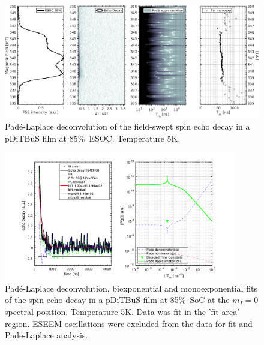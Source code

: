 \begin{figure}[h]
\center
	\includegraphics[width=1\textwidth]{./pulse/figures/Figure_S12.png}
	\caption{Pad{\'e}-Laplace deconvolution of the field-swept spin echo decay in a pDiTBuS film at 85\%~ESOC. Temperature 5K.}
	\label{fig:Figure_S12}
\end{figure}

\begin{figure}[ht!]
\center
	\includegraphics[width=0.9\textwidth]{./pulse/figures/Figure_S13.pdf}
	\caption{Pad{\'e}-Laplace deconvolution, biexponential and monoexponential fits of the spin echo decay in a pDiTBuS film at 85\%~SoC at the $m_I=0$ spectral position. Temperature 5K. Data was fit in the 'fit area' region. ESEEM oscillations were excluded from the data for fit and Pade-Laplace analysis.}
	\label{fig:Figure_S13}
\end{figure}



\newpage
